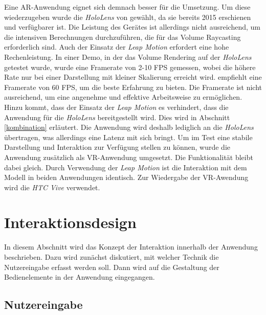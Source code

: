 Eine AR-Anwendung eignet sich demnach besser für die Umsetzung. Um diese wiederzugeben wurde die \textit{HoloLens} von \cite{hololens} gewählt, da sie bereits 2015 erschienen und verfügbarer ist.
Die Leistung des Gerätes ist allerdings nicht ausreichend, um die intensiven Berechnungen durchzuführen, die für das Volume Raycasting erforderlich sind. Auch der Einsatz der \textit{Leap Motion} erfordert eine hohe Rechenleistung.
In einer Demo, in der das Volume Rendering auf der \textit{HoloLens} getestet wurde, wurde eine Framerate von 2-10 FPS gemessen, wobei die höhere Rate nur bei einer Darstellung mit kleiner Skalierung erreicht wird. \cite{fpsHololens} empfiehlt eine Framerate von 60 FPS, um die beste Erfahrung zu bieten.
Die Framerate ist nicht ausreichend, um eine angenehme und effektive Arbeitsweise zu ermöglichen. 
Hinzu kommt, dass der Einsatz der \textit{Leap Motion} es verhindert, dass die Anwendung für die \textit{HoloLens} bereitgestellt wird. Dies wird in Abschnitt \ref{kombination} erläutert. Die Anwendung wird deshalb lediglich an die \textit{HoloLens} übertragen, was allerdings eine Latenz mit sich bringt. 
Um im Test eine stabile Darstellung und Interaktion zur Verfügung stellen zu können, wurde die Anwendung zusätzlich als VR-Anwendung umgesetzt. Die Funktionalität bleibt dabei gleich. 
Durch Verwendung der \textit{Leap Motion} ist die Interaktion mit dem Modell in beiden Anwendungen identisch. 
Zur Wiedergabe der VR-Awendung wird die \textit{HTC Vive} verwendet.

\section{Interaktionsdesign} 

In diesem Abschnitt wird das Konzept der Interaktion innerhalb der Anwendung beschrieben. Dazu wird zunächst diskutiert, mit welcher Technik die Nutzereingabe erfasst werden soll. Dann wird auf die Gestaltung der Bedienelemente in der Anwendung eingegangen.

\subsection{Nutzereingabe}

